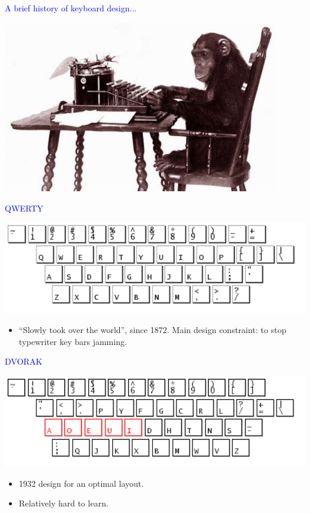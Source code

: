 \documentclass[landscape]{slides}
\begin{document}
\begin{slide}

    \textcolor{blue}{\Large{A brief history of keyboard design...}}

    \centering

    \includegraphics[width=0.9\textwidth]{chimp}

\end{slide}


\begin{slide}

    \textcolor{blue}{\Large{QWERTY}}

    \centering
    \includegraphics[width=20cm]{qwerty}

    \begin{itemize}
        \item ``Slowly took over the world'', since 1872. Main design constraint: to stop typewriter key bars jamming.
    \end{itemize}

\end{slide}


\begin{slide}

    \textcolor{blue}{\Large{DVORAK}}

    \centering
    \includegraphics[width=20cm]{dvorak}

    \begin{itemize}
        \item 1932 design for an optimal layout.
        \item Relatively hard to learn.
    \end{itemize}

\end{slide}
\end{document}
